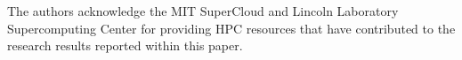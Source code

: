 The authors acknowledge the MIT SuperCloud and Lincoln Laboratory Supercomputing Center for providing HPC resources that have contributed to the research results reported within this paper. 
